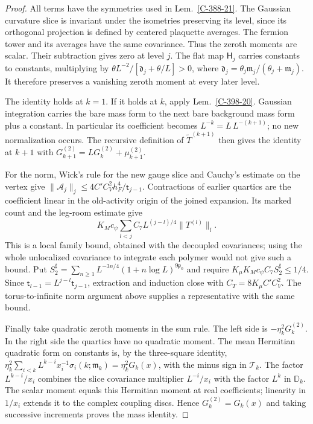 \documentclass[11pt,letterpaper,reqno]{amsart}
\theoremstyle{definition}
\theoremstyle{remark}
\begin{document}
\begin{proof}
All terms have the symmetries used in
Lem.~\ref{C-388-21}.  The Gaussian curvature slice is
invariant under the isometries preserving its level, since
its orthogonal projection is defined by centered plaquette
averages.  The fermion tower and its averages have the same
covariance.  Thus the zeroth moments are scalar.  Their
subtraction gives zero at level $j$.  The flat map
$\mathsf H_j$ carries constants to constants, multiplying
by
$\theta L^{-2}/[\mathfrak d_j+\theta/L]>0$, where
$\mathfrak d_j=\theta_j\mathfrak m_j/(\theta_j+\mathfrak m_j)$.
It therefore preserves a vanishing zeroth moment at every
later level.

The identity holds at $k=1$.  If it holds at $k$, apply
Lem.~\ref{C-398-20}.  Gaussian integration carries the
bare mass form to the next bare background mass form plus
a constant.  In particular its coefficient becomes
$L^{-k}=L\,L^{-(k+1)}$; no new normalization occurs.
The recursive definition of $\widetilde T^{(k+1)}$ then
gives the identity at $k+1$ with
$G_{k+1}^{(2)}=LG_k^{(2)}+\mu_{k+1}^{(2)}$.

For the norm, Wick's rule for the new gauge slice and
Cauchy's estimate on the vertex give
$\|\mathscr A_j\|_j\le4C'C_V^2h_F^4/\mathsf t_{j-1}$.
Contractions of earlier quartics are the coefficient linear
in the old-activity origin of the joined expansion.  Its
marked count and the leg-room estimate give
\[
 K_Mc_\psi\sum_{l<j}C_7L^{(j-l)/4}\|T^{(l)}\|_l.
\]
This is a local family bound, obtained with the decoupled
covariances; using the whole unlocalized covariance to
integrate each polymer would not give such a bound.
Put
$S_2^\sharp=\sum_{n\ge1}L^{-3n/4}(1+n\log L)^{9\mathfrak p_0}$
and require
$K_\mu K_Mc_\psi C_7S_2^\sharp\le1/4$.
Since $\mathsf t_{l-1}=L^{j-l}\mathsf t_{j-1}$, extraction and induction
close with $C_T=8K_\mu C'C_V^2$.
The torus-to-infinite norm argument above supplies a
representative with the same bound.

Finally take quadratic zeroth moments in the sum rule.
The left side is $-\eta_k^2G_k^{(2)}$.  In the right side
the quartics have no quadratic moment.  The mean Hermitian
quadratic form on constants is, by the three-square identity,
$\eta_k^2\sum_{i<k}L^{k-i}x_i^{-1}
\sigma_i(k;\mathfrak m_k)=\eta_k^2G_k(x)$, with the minus
sign in $\mathscr T_k$. The factor $L^{k-i}/x_i$ combines the
slice covariance multiplier $L^{-i}/x_i$ with the factor $L^k$
in $\mathbb D_k$. The scalar moment equals this
Hermitian moment at real coefficients; linearity in
$1/x_i$ extends it to the complex coupling discs.
Hence $G_k^{(2)}=G_k(x)$ and taking successive increments
proves the mass identity.
\end{proof}
\end{document}
